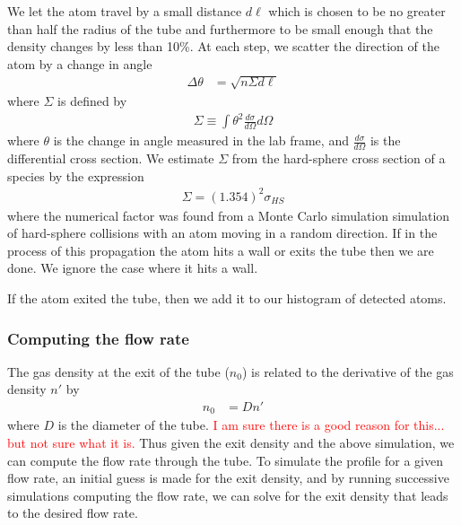 \documentclass{article}
\newcommand\fixme[1]{\textcolor{red}{\sc #1}}
\begin{document}
We let the atom travel by a small distance $d\ell$
which is chosen to be no greater than half the radius of the tube and
furthermore to be small enough that the density changes by less than
10\%.  At each step, we scatter the direction of the atom by a change
in angle
\begin{align}
  \Delta\theta &= \sqrt{n\Sigma d\ell}
\end{align}
where $\Sigma$ is defined by
\begin{align}
    \Sigma \equiv \int \theta^2 \frac{d\sigma}{d\Omega} d\Omega
\end{align}
where $\theta$ is the change in angle measured in the lab frame, and $\frac{d\sigma}{d\Omega}$ is the differential cross section.  We estimate $\Sigma$ from the hard-sphere cross section of a species by the expression
\begin{align}
    \Sigma = (1.354)^2\sigma_{HS}
\end{align}
where the numerical factor was found from a Monte Carlo simulation simulation of hard-sphere collisions with an atom moving in a random direction.
If in the process of this propagation the atom hits a wall or
exits the tube then we are done.  We ignore the case where it hits a
wall.

If the atom exited the tube, then we add it to our histogram of detected
atoms.

\subsubsection{Computing the flow rate}
The gas density at the exit of the tube ($n_0$) is related to the derivative of the gas density $n'$ by
\begin{align}
    n_0 &= D n'
\end{align}
where $D$ is the diameter of the tube.  \fixme{I am sure there is a good reason for this... but not sure what it is.}  Thus given the exit density and the above simulation, we can compute the flow rate through the tube.  To simulate the profile for a given flow rate, an initial guess is made for the exit density, and by running successive simulations computing the flow rate, we can solve for the exit density that leads to the desired flow rate.
\end{document}
